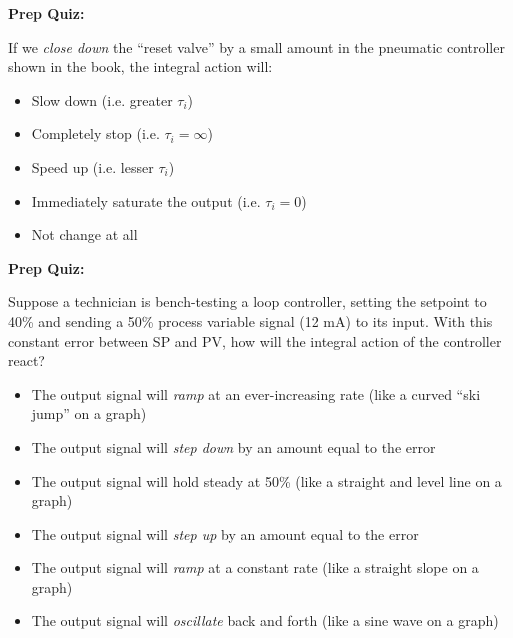 \vfil \eject

\noindent
{\bf Prep Quiz:}

If we {\it close down} the ``reset valve'' by a small amount in the pneumatic controller shown in the book, the integral action will:

\begin{itemize}
\item{} Slow down (i.e. greater $\tau_i$)
\vskip 5pt 
\item{} Completely stop (i.e. $\tau_i = \infty$)
\vskip 5pt 
\item{} Speed up (i.e. lesser $\tau_i$)
\vskip 5pt 
\item{} Immediately saturate the output (i.e. $\tau_i = 0$)
\vskip 5pt 
\item{} Not change at all
\end{itemize}













\vfil \eject

\noindent
{\bf Prep Quiz:}

Suppose a technician is bench-testing a loop controller, setting the setpoint to 40\% and sending a 50\% process variable signal (12 mA) to its input.  With this constant error between SP and PV, how will the integral action of the controller react?

\begin{itemize}
\item{} The output signal will {\it ramp} at an ever-increasing rate (like a curved ``ski jump'' on a graph)
\vskip 5pt 
\item{} The output signal will {\it step down} by an amount equal to the error 
\vskip 5pt 
\item{} The output signal will hold steady at 50\% (like a straight and level line on a graph)
\vskip 5pt 
\item{} The output signal will {\it step up} by an amount equal to the error
\vskip 5pt 
\item{} The output signal will {\it ramp} at a constant rate (like a straight slope on a graph)
\vskip 5pt 
\item{} The output signal will {\it oscillate} back and forth (like a sine wave on a graph)
\end{itemize}





